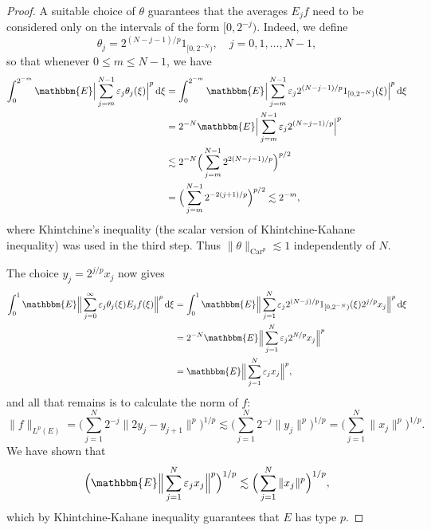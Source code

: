 \documentclass[a4paper,10pt]{amsart}
\theoremstyle{plain}
\theoremstyle{definition}
\theoremstyle{remark}
\begin{document}
\begin{proof}
    A suitable choice of $\theta$ guarantees that
    the averages $E_jf$ need to be considered only on the intervals
    of the form $[0,2^{-j})$. Indeed, we define
    \begin{equation*}
      \theta_j = 2^{(N-j-1)/p} 1_{[0,2^{-N})} , \quad j=0,1,\ldots , N-1 ,
    \end{equation*}
    so that whenever $0 \leq m \leq N-1$, we have
    \begin{align*}
      \int_0^{2^{-m}} {\mathbbm{E}} \Big| \sum_{j=m}^{N-1} \varepsilon_j \theta_j (\xi ) \Big|^p {\,\text{d}}\xi
      &= \int_0^{2^{-m}} {\mathbbm{E}} \Big| \sum_{j=m}^{N-1} 
      \varepsilon_j 2^{(N-j-1)/p} 1_{[0,2^{-N})}(\xi) \Big|^p {\,\text{d}}\xi \\
      &= 2^{-N} {\mathbbm{E}} \Big| \sum_{j=m}^{N-1} \varepsilon_j 2^{(N-j-1)/p} \Big|^p \\
      &\lesssim 2^{-N} \Big( \sum_{j=m}^{N-1} 2^{2(N-j-1)/p} \Big)^{p/2} \\
      &= \Big( \sum_{j=m}^{N-1} 2^{-2(j+1)/p} \Big)^{p/2} \lesssim 2^{-m} ,
    \end{align*}
    where Khintchine's inequality
    (the scalar version of Khintchine-Kahane inequality) was used in the third step.
    Thus $\| \theta \|_{\text{Car}^p} \lesssim 1$ independently of $N$.
    
    The choice $y_j = 2^{j/p}x_j$ now gives
    \begin{align*}
      \int_0^1 {\mathbbm{E}} \Big\| \sum_{j=0}^{\infty} \varepsilon_j \theta_j(\xi) E_jf(\xi) \Big\|^p {\,\text{d}}\xi
      &= \int_0^1 {\mathbbm{E}} \Big\| \sum_{j=1}^N 
      \varepsilon_j 2^{(N-j)/p} 1_{[0,2^{-N})} (\xi) 2^{j/p}x_j \Big\|^p {\,\text{d}}\xi \\
      &= 2^{-N} {\mathbbm{E}} \Big\| \sum_{j=1}^N \varepsilon_j 2^{N/p} x_j \Big\|^p \\
      &= {\mathbbm{E}} \Big\| \sum_{j=1}^N \varepsilon_j x_j \Big\|^p ,
    \end{align*}
    and all that remains is to calculate the norm of $f$:
    \begin{equation*}
      \| f \|_{L^p(E)} = \Big( \sum_{j=1}^N 2^{-j} \| 2y_j - y_{j+1} \|^p \Big) ^{1/p}
      \lesssim \Big( \sum_{j=1}^N 2^{-j} \| y_j \|^p \Big)^{1/p} 
      = \Big( \sum_{j=1}^N \| x_j \|^p \Big)^{1/p} .
    \end{equation*}
    We have shown that
    \begin{equation*}
      \Big( {\mathbbm{E}} \Big\| \sum_{j=1}^N \varepsilon_j x_j \Big\|^p \Big)^{1/p} 
      \lesssim \Big( \sum_{j=1}^N \| x_j \|^p \Big)^{1/p} ,
    \end{equation*}
    which by Khintchine-Kahane inequality guarantees that $E$ has type $p$.
    

\end{proof}
\end{document}
